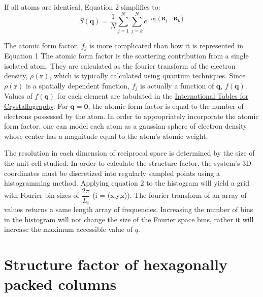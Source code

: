 \documentclass{article}
\begin{document}
  If all atoms are identical, Equation 2 %
  simplifies to:
  \begin{equation}\label{eqn:simplified_sf}
  S(\mathbf{q})= \dfrac{1}{N}\sum_{j=1}^{N}\sum_{j=k}^{N}e^{-i\mathbf{q}\boldsymbol{\cdot}(\mathbf{R_j}- \mathbf{R_k})}
  \end{equation}

  The atomic form factor, $f_j$ is more complicated than how it is represented
  in Equation 1 %
  The atomic form factor is the scattering
  contribution from a single isolated atom. They are calculated as the fourier
  transform of the electron density, $\rho({\mathbf{r}})$,  which is typically
  calculated using quantum techniques. Since $\rho({\mathbf{r}})$ is a spatially
  dependent function, $f_j$ is actually a function of $\mathbf{q}$,
  $f(\mathbf{q})$. Values of $f(\mathbf{q})$ for each element are tabulated in
  the \href{http://it.iucr.org/Cb/ch6o1v0001/}{International Tables for
  Crystallography}. For $\mathbf{q}=\mathbf{0}$, the atomic form factor is equal to the 
  number of electrons possessed by the atom. In order to appropriately incorporate
  the atomic form factor, one can model each atom as a gaussian sphere of electron
  density whose center has a magnitude equal to the atom's atomic weight. 

  The resolution in each dimension of reciprocal space is determined by the
  size of the unit cell studied. In order to calculate the structure factor, the
  system's 3D coordinates must be discretized into regularly sampled points using
  a histogramming method. Applying equation 2 %
  to the histogram
  will yield a grid with Fourier bin sizes of $\dfrac{2\pi}{L_i}$ (i = (x,y,z)).
  The fourier transform of an array of values returns a same length array of
  frequencies. Increasing the number of bins in the histogram will not change the
  size of the Fourier space bins, rather it will increase the maximum accessible
  value of $q$. 

  \section{Structure factor of hexagonally packed columns}
\end{document}
